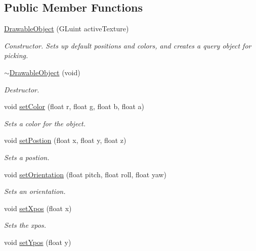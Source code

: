 \subsection*{Public Member Functions}
\begin{DoxyCompactItemize}
\item 
\hyperlink{class_drawable_object_a1c36556e2e37722200f8c367bc41ddc7}{Drawable\-Object} (G\-Luint active\-Texture)
\begin{DoxyCompactList}\small\item\em Constructor. Sets up default positions and colors, and creates a query object for picking. \end{DoxyCompactList}\item 
\hyperlink{class_drawable_object_ae71d57c71f7fc83fea0d0c1580dface4}{$\sim$\-Drawable\-Object} (void)
\begin{DoxyCompactList}\small\item\em Destructor. \end{DoxyCompactList}\item 
void \hyperlink{class_drawable_object_a58423e47f0b738f76bf37e0b5a898ae2}{set\-Color} (float r, float g, float b, float a)
\begin{DoxyCompactList}\small\item\em Sets a color for the object. \end{DoxyCompactList}\item 
void \hyperlink{class_drawable_object_aa8b950feb76e091c4cb51fcca7fb4b9f}{set\-Postion} (float x, float y, float z)
\begin{DoxyCompactList}\small\item\em Sets a postion. \end{DoxyCompactList}\item 
void \hyperlink{class_drawable_object_a42c21ea400f91eb3656c4d4c0c0382c5}{set\-Orientation} (float pitch, float roll, float yaw)
\begin{DoxyCompactList}\small\item\em Sets an orientation. \end{DoxyCompactList}\item 
void \hyperlink{class_drawable_object_abf6e15098bba6c16ca87a5986333ebec}{set\-Xpos} (float x)
\begin{DoxyCompactList}\small\item\em Sets the xpos. \end{DoxyCompactList}\item 
void \hyperlink{class_drawable_object_a0d69b84cb0b8a9325b1a6b2316eaaba4}{set\-Ypos} (float y)

\end{DoxyCompactItemize}
